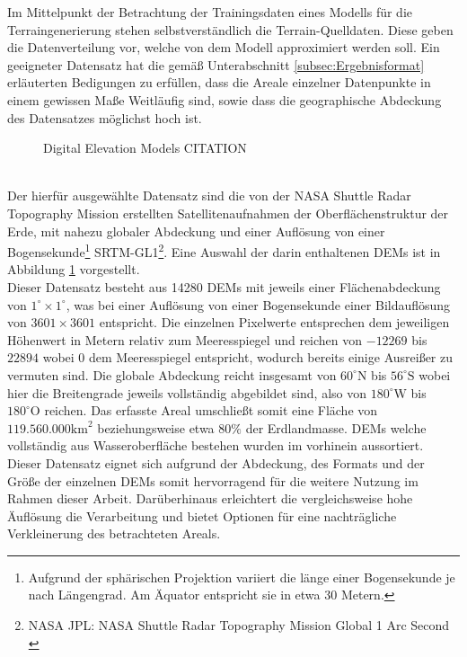 Im Mittelpunkt der Betrachtung der Trainingsdaten eines Modells für die Terraingenerierung stehen selbstverständlich die Terrain-Quelldaten. Diese geben die Datenverteilung vor, welche von dem Modell approximiert werden soll. Ein geeigneter Datensatz hat die gemäß Unterabschnitt \ref{subsec:Ergebnisformat} erläuterten Bedigungen zu erfüllen, dass die Areale einzelner Datenpunkte in einem gewissen Maße Weitläufig sind, sowie dass die geographische Abdeckung des Datensatzes möglichst hoch ist. 
\begin{figure}[htbp]
    \centering
    \caption{Digital Elevation Models CITATION}
    \label{fig:SRTM}
\end{figure} \\
Der hierfür ausgewählte Datensatz sind die von der NASA Shuttle Radar Topography Mission erstellten Satellitenaufnahmen der Oberflächenstruktur der Erde, mit nahezu globaler Abdeckung und einer Auflösung von einer Bogensekunde\footnote{
    Aufgrund der sphärischen Projektion variiert die länge einer Bogensekunde je nach Längengrad. Am Äquator entspricht sie in etwa 30 Metern.
} SRTM-GL1\footnote{
    NASA JPL: NASA Shuttle Radar Topography Mission Global 1 Arc Second
    \cite{nasa2013srtm}
}. Eine Auswahl der darin enthaltenen \ac{DEM}s ist in Abbildung \ref{fig:SRTM} vorgestellt. \\
Dieser Datensatz besteht aus 14280 \ac{DEM}s mit jeweils einer Flächenabdeckung von $1^{\circ}\times1^{\circ}$, was bei einer Auflösung von einer Bogensekunde einer Bildauflösung von $3601\times3601$ entspricht. Die einzelnen Pixelwerte entsprechen dem jeweiligen Höhenwert in Metern relativ zum Meeresspiegel und reichen von $-12269$ bis $22894$ wobei $0$ dem Meeresspiegel entspricht, wodurch bereits einige Ausreißer zu vermuten sind. Die globale Abdeckung reicht insgesamt von $60^{\circ}\text{N}$ bis $56^{\circ}\text{S}$ wobei hier die Breitengrade jeweils vollständig abgebildet sind, also von $180^{\circ}\text{W}$ bis $180^{\circ}\text{O}$ reichen. Das erfasste Areal umschließt somit eine Fläche von $119.560.000\text{km}^2$ beziehungsweise etwa $80\%$ der Erdlandmasse. DEMs welche vollständig aus Wasseroberfläche bestehen wurden im vorhinein aussortiert. \\
Dieser Datensatz eignet sich aufgrund der Abdeckung, des Formats und der Größe der einzelnen \ac{DEM}s somit hervorragend für die weitere Nutzung im Rahmen dieser Arbeit. Darüberhinaus erleichtert die vergleichsweise hohe Äuflösung die Verarbeitung und bietet Optionen für eine nachträgliche Verkleinerung des betrachteten Areals.

